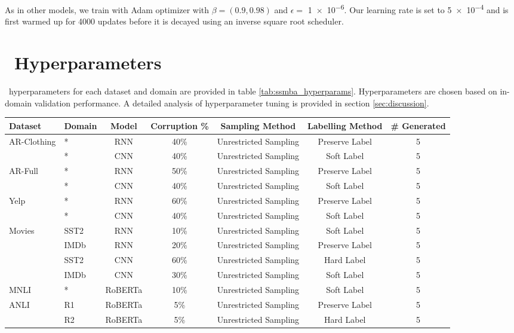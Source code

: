 As in other models, we train with Adam optimizer \citep{kingma2014method} with $\beta = (0.9, 0.98)$ and $\epsilon =$ \num{1e-6}.
Our learning rate is set to \num{5e-4} and is first warmed up for 4000 updates before it is decayed using an inverse square root scheduler.

\section{\ssmba\ Hyperparameters}
\label{app:ssmba}
\ssmba\ hyperparameters for each dataset and domain are provided in table \ref{tab:ssmba_hyperparams}. 
Hyperparameters are chosen based on in-domain validation performance. A detailed analysis of hyperparameter tuning is provided in section \ref{sec:discussion}.

\begin{table*}[t]
\small
\centering
\begin{tabular}{llccccc}
\toprule
Dataset & Domain & Model & Corruption \% & Sampling Method & Labelling Method & \# Generated\\
\midrule
\multirow{2}{*}{AR-Clothing}
& * & RNN & 40\% & Unrestricted Sampling & Preserve Label & 5\\
& * & CNN & 40\% & Unrestricted Sampling & Soft Label & 5\\
\midrule
\multirow{2}{*}{AR-Full}
& * & RNN & 50\% & Unrestricted Sampling & Preserve Label & 5\\
& * & CNN & 40\% & Unrestricted Sampling & Soft Label & 5\\
\midrule
\multirow{2}{*}{Yelp}
& * & RNN & 60\% & Unrestricted Sampling & Preserve Label & 5\\
& * & CNN & 40\% & Unrestricted Sampling & Soft Label & 5\\
\multirow{4}{*}{Movies}
& SST2 & RNN & 10\% & Unrestricted Sampling & Soft Label & 5\\
& IMDb & RNN & 20\% & Unrestricted Sampling & Preserve Label & 5\\
& SST2 & CNN & 60\% & Unrestricted Sampling & Hard Label & 5\\
& IMDb & CNN & 30\% & Unrestricted Sampling & Soft Label & 5\\
\midrule
MNLI & * & RoBERTa & 10\% & Unrestricted Sampling & Soft Label & 5\\
\midrule
\multirow{3}{*}{ANLI}
& R1 & RoBERTa & 5\% & Unrestricted Sampling & Preserve Label & 5\\
& R2 & RoBERTa & 5\% & Unrestricted Sampling & Hard Label & 5\\

\end{tabular}
\end{table*}
